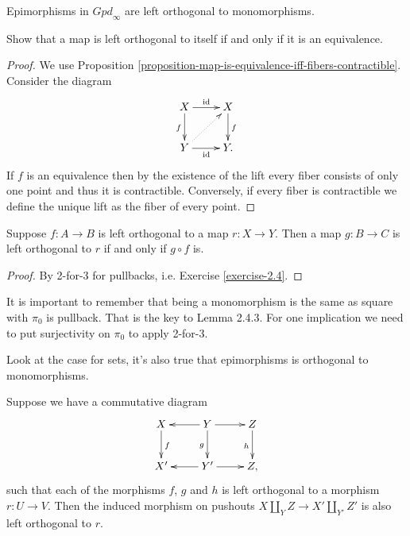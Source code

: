 \begin{lemma}
\label{lemma-epimorphisms-are-left-orthogonal-to-monomorphisms}
Epimorphisms in $\mathit{Gpd}_\infty$ are left orthogonal to
monomorphisms.
\end{lemma}

\begin{exercise}
\label{exercise-2.11}
Show that a map is left orthogonal
to itself if and only if it is an equivalence.
\end{exercise}

\begin{proof}
We use Proposition 
\ref{proposition-map-is-equivalence-iff-fibers-contractible}.
Consider the diagram
$$
\xymatrix{
X\ar[r]^{\text{id}}\ar[d]_{f}&X\ar[d]^{f}\\
Y\ar[r]_{\text{id}}\ar@{.>}[ur]&Y.
}
$$
If $f$ is an equivalence then 
by the existence of the lift
every fiber consists of only one point and
thus it is contractible.
Conversely, if every fiber is contractible
we define the unique lift as the fiber of every point.
\end{proof}

\begin{lemma}
\label{lemma-orthogonality-and-composition}
Suppose $f:A \to B$ is left orthogonal
to a map $r:X \to Y$.
Then a map $g:B \to C$ is left
orthogonal to $r$ if and only if $g \circ f$ is.
\end{lemma}

\begin{proof}
By 2-for-3 for pullbacks, i.e. Exercise \ref{exercise-2.4}.
\end{proof}

It is important to remember that
being a monomorphism is the same
as square with $\pi_0$ is pullback.
That is the key to Lemma 2.4.3.
For one implication we need
to put surjectivity on $\pi_0$
to apply 2-for-3.

Look at the case for sets,
it's also true that epimorphisms
is orthogonal to monomorphisms.

\begin{lemma}
\label{lemma-orthogonality-for-pushout-diagram}
Suppose we have a commutative diagram
\begin{equation}
\label{equation-orthogonal-lemma}
\xymatrix{
X\ar[d]^f& Y \ar[l]\ar[d]_g \ar[r]& Z\ar[d]_h\\
X'&Y' \ar[l]\ar[r]&Z,
}
\end{equation}
such that each of the morphisms $f$, $g$ and $h$ 
is left orthogonal to a morphism $r:U \to V$.
Then the induced morphism on pushouts
$X \amalg_Y Z \to X' \amalg_{Y'}Z'$ is
also left orthogonal to $r$.
\end{lemma}


